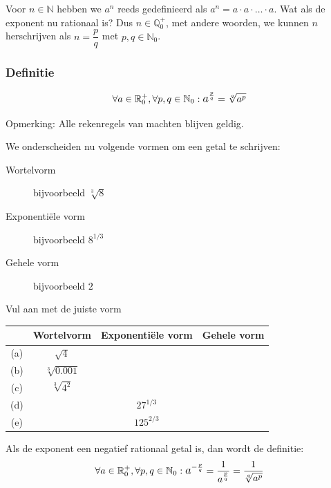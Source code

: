 \documentclass[12pt,twoside,a4paper]{article}
\begin{document}
Voor $n\in\mathbb{N}$ hebben we $a^n$ reeds gedefinieerd als $a^n=a\cdot a\cdot \ldots \cdot a$. Wat als de exponent nu rationaal is? Dus $n\in\mathbb{Q}^+_0$, met andere woorden, we kunnen $n$ herschrijven als $n=\dfrac{p}{q}$ met $p,q\in\mathbb{N}_0$.

\subsubsection*{Definitie}
\begin{mdframed}
$$\forall a \in \mathbb{R}^+_0, \forall p,q\in  \mathbb{N}_0: \mathlarger a^{\frac{p}{q}}=\sqrt[q]{a^p}$$
\end{mdframed}

Opmerking: Alle rekenregels van machten blijven geldig.

We onderscheiden nu volgende vormen om een getal te schrijven:
\begin{description}
\item[Wortelvorm] bijvoorbeeld $\sqrt[3]{8}$
\item[Exponentiële vorm] bijvoorbeeld $8^{1/3}$
\item[Gehele vorm] bijvoorbeeld $2$
\end{description}

\begin{oefening}
  Vul aan met de juiste vorm
  \begin{center}
  \begin{tabular}{c|c|c|c}
        & Wortelvorm        & Exponentiële vorm & Gehele vorm \\
    \hline
    (a) & $\sqrt{4}$        &                   &             \\
    (b) & $\sqrt[3]{0.001}$ &                   &             \\
    (c) & $\sqrt[3]{4^2}$   &                   &             \\
    (d) &                   & $27^{1/3}$        &             \\
    (e) &                   & $125^{2/3}$       &             \\
  \end{tabular}
\end{center}
\end{oefening}

Als de exponent een negatief rationaal getal is, dan wordt de definitie:
$$\forall a \in \mathbb{R}^+_0, \forall p,q\in  \mathbb{N}_0: \mathlarger a^{-\frac{p}{q}}=\dfrac{1}{a^{\frac{p}{q}}}=\dfrac{1}{\sqrt[q]{a^p}}$$
\end{document}
